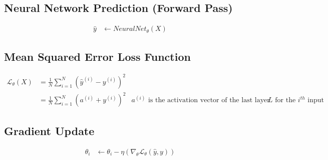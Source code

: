 \documentclass{article}
\begin{document}
\subsection{Neural Network Prediction (Forward Pass)}
\begin{align}
	\hat{y} & \gets NeuralNet_\theta(X)
\end{align}

\subsection{Mean Squared Error Loss Function}
\begin{equation}
	\begin{aligned}
		\mathcal{L}_\theta(X) & =
		\frac{1}{N} \sum_{i=1}^{N}{ (\hat{y}^{(i)} - y^{(i)} )^{2}}                                                                                                            \\
		                      & = \frac{1}{N} \sum_{i=1}^{N}{(a^{(i)} + y^{(i)})^{2}} & \text{$a^{(i)}$ is the activation vector of the last layer $L$ for the $i^{th}$ input}
	\end{aligned}
\end{equation}

\subsection{Gradient Update}
\begin{align}
	\theta_i & \gets \theta_i - \eta (\nabla_\theta \mathcal{L}_{\theta}(\hat{y}, y))
\end{align}

\printbibliography
\end{document}
